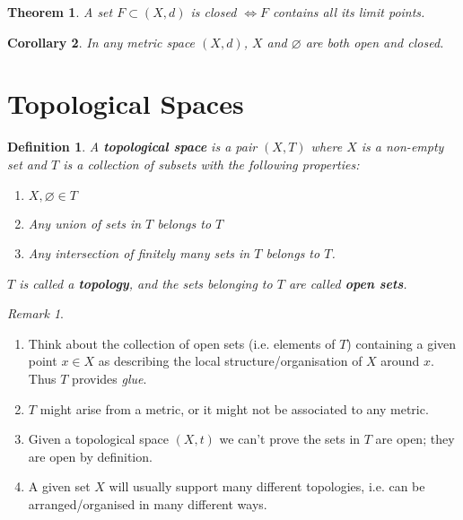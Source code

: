 \documentclass{article}
\renewcommand{\emptyset}{\varnothing}
\newtheorem{theorem}{Theorem}[section]
\newtheorem{corollary}[theorem]{Corollary}
\newtheorem{sdefinition}[stheorem]{Definition}
\theoremstyle{remark}
\theoremstyle{example}
\theoremstyle{examples}
\newtheorem*{remark}{Remark}
\begin{document}
	\begin{theorem}
		A set $F \subset (X,d)$ is closed $\iff F$ contains all its limit points.
	\end{theorem}

	\begin{corollary}
		In any metric space $(X,d)$, $X$ and $\varnothing$ are both open and closed.
	\end{corollary}
	\pagebreak

	\section{Topological Spaces}
	\addtocounter{theorem}{1}
	\begin{sdefinition}
		\label{topologicalspace}
		A \textbf{topological space} is a pair $(X,T)$ where $X$ is a non-empty set and $T$ is a collection of subsets with the following properties:
		\begin{enumerate}
			\item $X, \emptyset \in T$
			\item Any union of sets in $T$ belongs to $T$
			\item Any intersection of finitely many sets in $T$ belongs to $T$.
		\end{enumerate}
		$T$ is called a \textbf{topology}, and the sets belonging to $T$ are called \textbf{open sets}.
	\end{sdefinition}

	\begin{remark}\ 
		\begin{enumerate}
			\item Think about the collection of open sets (i.e. elements of $T$) containing a given point $x \in X$ as describing the local structure/organisation of $X$ around $x$. Thus $T$ provides \textit{glue}.
			\item $T$ might arise from a metric, or it might not be associated to any metric.
			\item Given a topological space $(X,t)$ we can't prove the sets in $T$ are open; they are open by definition.
			\item A given set $X$ will usually support many different topologies, i.e. can be arranged/organised in many different ways.
		\end{enumerate}
	\end{remark}
\end{document}
